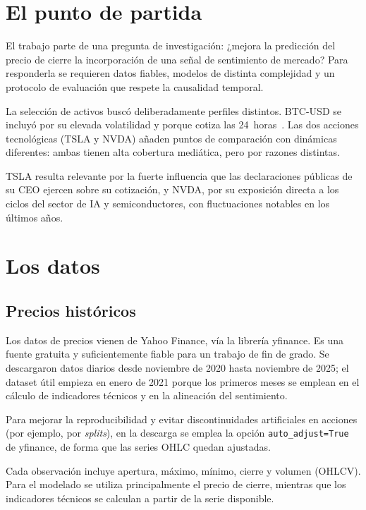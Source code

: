 \section{El punto de partida}

El trabajo parte de una pregunta de investigación: ¿mejora la predicción del precio de cierre la incorporación de una señal de sentimiento de mercado? Para responderla se requieren datos fiables, modelos de distinta complejidad y un protocolo de evaluación que respete la causalidad temporal.

La selección de activos buscó deliberadamente perfiles distintos. BTC-USD se incluyó por su elevada volatilidad y porque cotiza las 24~horas~\cite{corbet2019cryptocurrencies}. Las dos acciones tecnológicas (TSLA y NVDA) añaden puntos de comparación con dinámicas diferentes: ambas tienen alta cobertura mediática, pero por razones distintas.

TSLA resulta relevante por la fuerte influencia que las declaraciones públicas de su CEO ejercen sobre su cotización, y NVDA, por su exposición directa a los ciclos del sector de IA y semiconductores, con fluctuaciones notables en los últimos años.

\section{Los datos}

\subsection{Precios históricos}

Los datos de precios vienen de Yahoo Finance, vía la librería yfinance. Es una fuente gratuita y suficientemente fiable para un trabajo de fin de grado. Se descargaron datos diarios desde noviembre de 2020 hasta noviembre de 2025; el dataset útil empieza en enero de 2021 porque los primeros meses se emplean en el cálculo de indicadores técnicos y en la alineación del sentimiento.

Para mejorar la reproducibilidad y evitar discontinuidades artificiales en acciones (por ejemplo, por \textit{splits}), en la descarga se emplea la opción \texttt{auto\_adjust=True} de yfinance, de forma que las series OHLC quedan ajustadas.

Cada observación incluye apertura, máximo, mínimo, cierre y volumen (OHLCV). Para el modelado se utiliza principalmente el precio de cierre, mientras que los indicadores técnicos se calculan a partir de la serie disponible.

